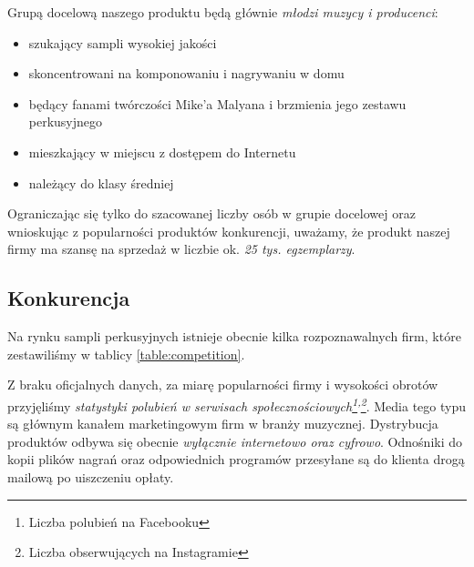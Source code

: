 \documentclass[12pt]{article}
\begin{document}
Grupą docelową naszego produktu będą głównie \emph{młodzi muzycy i producenci}:
\begin{itemize}
    \item szukający sampli wysokiej jakości
    \item skoncentrowani na komponowaniu i nagrywaniu w domu
    \item będący fanami twórczości Mike'a Malyana i brzmienia jego zestawu perkusyjnego
    \item mieszkający w miejscu z dostępem do Internetu
    \item należący do klasy średniej
\end{itemize}

Ograniczając się tylko do szacowanej liczby osób w grupie docelowej oraz wnioskując z popularności produktów konkurencji, uważamy, że produkt naszej firmy ma szansę na sprzedaż w liczbie ok. \emph{25 tys. egzemplarzy}.

\subsection{Konkurencja}


Na rynku sampli perkusyjnych istnieje obecnie kilka rozpoznawalnych firm, które zestawiliśmy w tablicy \ref{table:competition}.

Z braku oficjalnych danych, za miarę popularności firmy i wysokości obrotów przyjęliśmy \emph{statystyki polubień w serwisach społecznościowych\footnote{Liczba polubień na Facebooku\label{footnote:facebook}}\textsuperscript{,}\footnote{Liczba obserwujących na Instagramie\label{footnote:instagram}}}.
Media tego typu są głównym kanałem marketingowym firm w branży muzycznej.
Dystrybucja produktów odbywa się obecnie \emph{wyłącznie internetowo oraz cyfrowo}.
Odnośniki do kopii plików nagrań oraz odpowiednich programów przesyłane są do klienta drogą mailową po uiszczeniu opłaty.
\end{document}
